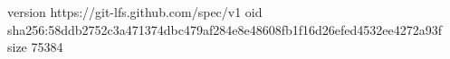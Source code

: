 version https://git-lfs.github.com/spec/v1
oid sha256:58ddb2752c3a471374dbc479af284e8e48608fb1f16d26efed4532ee4272a93f
size 75384
